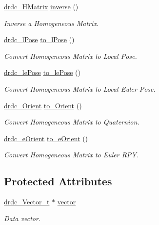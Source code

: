 \begin{CompactItemize}
\hyperlink{classdrdc__HMatrix}{drdc\_\-HMatrix} \hyperlink{classdrdc__HMatrix_315a6b078d1d53eae992c70ec21fc1c4}{inverse} ()
\begin{CompactList}\small\item\em Inverse a Homogeneous Matrix. \item\end{CompactList}\item 
\hyperlink{classdrdc__lPose}{drdc\_\-lPose} \hyperlink{classdrdc__HMatrix_dba5a3f501e9831e97bd18c1857b84d9}{to\_\-lPose} ()
\begin{CompactList}\small\item\em Convert Homogeneous Matrix to Local Pose. \item\end{CompactList}\item 
\hyperlink{classdrdc__lePose}{drdc\_\-lePose} \hyperlink{classdrdc__HMatrix_d87777199dadee62fbd5508956ab14b8}{to\_\-lePose} ()
\begin{CompactList}\small\item\em Convert Homogeneous Matrix to Local Euler Pose. \item\end{CompactList}\item 
\hyperlink{classdrdc__Orient}{drdc\_\-Orient} \hyperlink{classdrdc__HMatrix_07a66bec680b8e525741a89d85fa766a}{to\_\-Orient} ()
\begin{CompactList}\small\item\em Convert Homogeneous Matrix to Quaternion. \item\end{CompactList}\item 
\hyperlink{classdrdc__eOrient}{drdc\_\-eOrient} \hyperlink{classdrdc__HMatrix_57523497b807ffcc61239f4b1a577aa1}{to\_\-eOrient} ()
\begin{CompactList}\small\item\em Convert Homogeneous Matrix to Euler RPY. \item\end{CompactList}\end{CompactItemize}
\subsection*{Protected Attributes}
\begin{CompactItemize}
\item 
\hyperlink{structdrdc__Vector__t}{drdc\_\-Vector\_\-t} $\ast$ \hyperlink{classdrdc__HMatrix_c37eb823c50302c2c53c1be325373f0c}{vector}
\begin{CompactList}\small\item\em Data vector. \item\end{CompactList}\end{CompactItemize}


